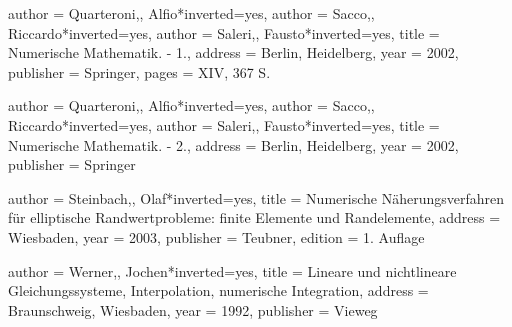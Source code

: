 \begin{bibdiv}
\begin{biblist}


 {
    author = {{Quarteroni,}, Alfio}*{inverted={yes}},
    author = {{Sacco,}, Riccardo}*{inverted={yes}},
    author = {{Saleri,}, Fausto}*{inverted={yes}},
    title = {Numerische Mathematik. - 1.},
    address = {Berlin, Heidelberg},
    year = {2002},
    publisher = {Springer},
    pages = {XIV, 367 S.}
}

 {
    author = {{Quarteroni,}, Alfio}*{inverted={yes}},
    author = {{Sacco,}, Riccardo}*{inverted={yes}},
    author = {{Saleri,}, Fausto}*{inverted={yes}},
    title = {Numerische Mathematik. - 2.},
    address = {Berlin, Heidelberg},
    year = {2002},
    publisher = {Springer}
}


 {
    author = {{Steinbach,}, Olaf}*{inverted={yes}},
    title = {Numerische Näherungsverfahren für elliptische Randwertprobleme: finite Elemente und Randelemente},
    address = {Wiesbaden},
    year = {2003},
    publisher = {Teubner},
    edition = {1. Auflage}
}

 {
    author = {{Werner,}, Jochen}*{inverted={yes}},
    title = {Lineare und nichtlineare Gleichungssysteme, Interpolation, numerische Integration},
    address = {Braunschweig, Wiesbaden},
    year = {1992},
    publisher = {Vieweg}
}

\end{biblist}
\end{bibdiv}
